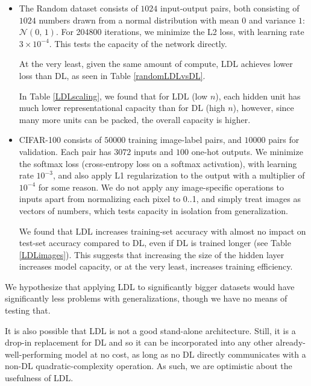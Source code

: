 \documentclass{article}
\begin{document}
\begin{itemize}
\item The Random dataset consists of $1024$ input-output pairs, both consisting of $1024$ numbers drawn from a normal distribution with mean $0$ and variance $1$: $\mathcal{N}(0,\,1)$. For 204800 iterations, we minimize the L2 loss, with learning rate $3 \times 10^{-4}$. This tests the capacity of the network directly.

At the very least, given the same amount of compute, LDL achieves lower loss than DL, as seen in Table \ref{randomLDLvsDL}.

In Table \ref{LDLscaling}, we found that for LDL (low $n$), each hidden unit has much lower representational capacity than for DL (high $n$), however, since many more units can be packed, the overall capacity is higher.

\item CIFAR-100 consists of $50000$ training image-label pairs, and $10000$ pairs for validation. Each pair has $3072$ inputs and $100$ one-hot outputs. We minimize the softmax loss (cross-entropy loss on a softmax activation), with learning rate $10^{-3}$, and also apply L1 regularization to the output with a multiplier of $10^{-4}$ for some reason. We do not apply any image-specific operations to inputs apart from normalizing each pixel to 0..1, and simply treat images as vectors of numbers, which tests capacity in isolation from generalization.

We found that LDL increases training-set accuracy with almost no impact on test-set accuracy compared to DL, even if DL is trained longer (see Table \ref{LDLimages}). This suggests that increasing the size of the hidden layer increases model capacity, or at the very least, increases training efficiency.
\end{itemize}

We hypothesize that applying LDL to significantly bigger datasets would have significantly less problems with generalizations, though we have no means of testing that.

It is also possible that LDL is not a good stand-alone architecture. Still, it is a drop-in replacement for DL and so it can be incorporated into any other already-well-performing model at no cost, as long as no DL directly communicates with a non-DL quadratic-complexity operation. As such, we are optimistic about the usefulness of LDL.
\end{document}
